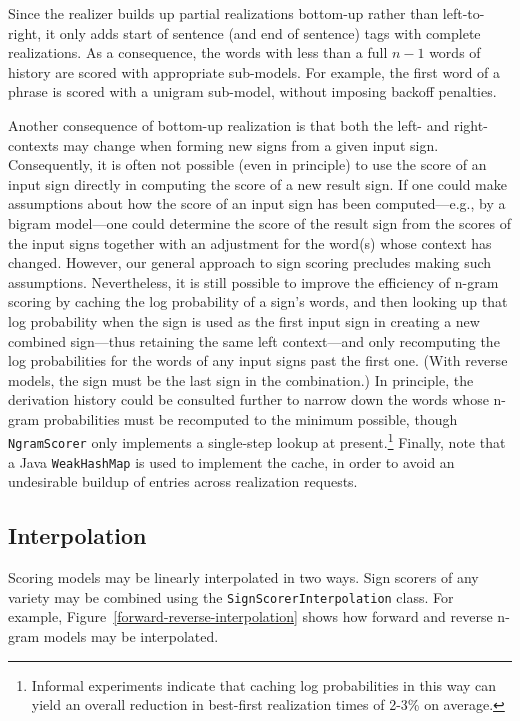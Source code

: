 \documentclass[11pt]{article}
\newcommand{\code}[1]{\texttt{#1}} %
\begin{document}
Since the realizer builds up partial realizations bottom-up rather than
left-to-right, it only adds start of sentence (and end of sentence) tags
with complete realizations. As a consequence, the words with less than a
full $n-1$ words of history are scored with appropriate sub-models. For
example, the first word of a phrase is scored with a unigram sub-model,
without imposing backoff penalties.

Another consequence of bottom-up realization is that both the left- and
right-contexts may change when forming new signs from a given input
sign. Consequently, it is often not possible (even in principle) to use
the score of an input sign directly in computing the score of a new
result sign. If one could make assumptions about how the score of an
input sign has been computed---e.g., by a bigram model---one could
determine the score of the result sign from the scores of the input
signs together with an adjustment for the word(s) whose context has
changed. However, our general approach to sign scoring precludes making
such assumptions. Nevertheless, it is still possible to improve the
efficiency of n-gram scoring by caching the log probability of a sign's
words, and then looking up that log probability when the sign is used as
the first input sign in creating a new combined sign---thus retaining
the same left context---and only recomputing the log probabilities for
the words of any input signs past the first one. (With reverse models,
the sign must be the last sign in the combination.) In principle, the
derivation history could be consulted further to narrow down the words
whose n-gram probabilities must be recomputed to the minimum possible,
though \code{Ngram\-Scorer} only implements a single-step lookup at
present.\footnote{Informal experiments indicate that caching log
probabilities in this way can yield an overall reduction in best-first
realization times of 2-3\% on average.} Finally, note that a Java
\code{Weak\-Hash\-Map} is used to implement the cache, in order to avoid
an undesirable buildup of entries across realization requests.

\subsection{Interpolation}
\label{interpolation}

Scoring models may be linearly interpolated in two ways.  Sign scorers
of any variety may be combined using the \code{Sign\-Scorer\-Interpolation} 
class.  For example, Figure~\ref{forward-reverse-interpolation} shows 
how forward and reverse n-gram models may be interpolated.
\end{document}
